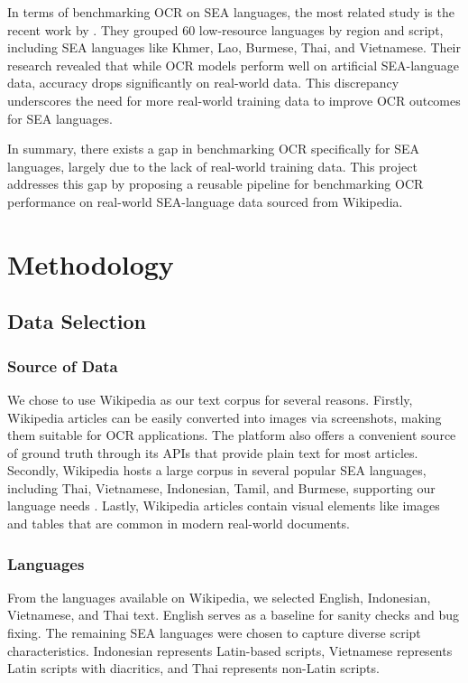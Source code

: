 \documentclass[12pt,oneside]{memoir}
\begin{document}
In terms of benchmarking OCR on SEA languages, the most related study is the recent work by \textcite{ignat-etal-2022}.
They grouped 60 low-resource languages by region and script, including SEA languages like Khmer, Lao, Burmese, Thai, and Vietnamese.
Their research revealed that while OCR models perform well on artificial SEA-language data, accuracy drops significantly on real-world data.
This discrepancy underscores the need for more real-world training data to improve OCR outcomes for SEA languages.

In summary, there exists a gap in benchmarking OCR specifically for SEA languages, largely due to the lack of real-world training data.
This project addresses this gap by proposing a reusable pipeline for benchmarking OCR performance on real-world SEA-language data sourced from Wikipedia.

\chapter{Methodology}

\section{Data Selection}

\subsection{Source of Data}
We chose to use Wikipedia as our text corpus for several reasons.
Firstly, Wikipedia articles can be easily converted into images via screenshots, making them suitable for OCR applications. 
The platform also offers a convenient source of ground truth through its APIs that provide plain text for most articles.
Secondly, Wikipedia hosts a large corpus in several popular SEA languages, including Thai, Vietnamese, Indonesian, Tamil, and Burmese, supporting our language needs \parencite{list-of-wikipedias-2024}. 
Lastly, Wikipedia articles contain visual elements like images and tables that are common in modern real-world documents.

\subsection{Languages}
From the languages available on Wikipedia, we selected English, Indonesian, Vietnamese, and Thai text. 
English serves as a baseline for sanity checks and bug fixing.
The remaining SEA languages were chosen to capture diverse script characteristics. 
Indonesian represents Latin-based scripts, Vietnamese represents Latin scripts with diacritics, and Thai represents non-Latin scripts. 
\end{document}
